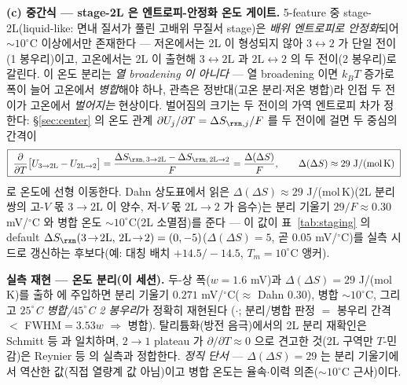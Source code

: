 \textbf{(c) 중간식 --- stage-2L 은 엔트로피-안정화 온도 게이트.}
5-feature 중 stage-2L(liquid-like: 면내 질서가 풀린 고배위 무질서 stage)은 \emph{배위 엔트로피로 안정화}되어
$\sim\!10^\circ$C 이상에서만 존재한다 --- 저온에서는 2L 이 형성되지 않아 $3\!\leftrightarrow\!2$ 가 단일 전이
(1 봉우리)이고, 고온에서는 2L 이 출현해 $3\!\leftrightarrow\!2\mathrm L$ 과 $2\mathrm L\!\leftrightarrow\!2$ 의
두 전이(2 봉우리)로 갈린다. 이 온도 분리는 \emph{열 broadening 이 아니다} --- 열 broadening 이면 $k_BT$
증가로 폭이 늘어 고온에서 \emph{병합}해야 하나, 관측은 정반대(고온 분리$\cdot$저온 병합)라 인접 두 전이가
고온에서 \emph{벌어지는} 현상이다. 벌어짐의 크기는 두 전이의 가역 엔트로피 차가 정한다: \S\ref{sec:center}
의 온도 관계 $\partial U_j/\partial T=\Delta S_{\rxn,j}/F$ 를 두 전이에 걸면 두 중심의 간격이
\begin{equation}
\boxed{\;\frac{\partial}{\partial T}\big[U_{3\to2\mathrm L}-U_{2\mathrm L\to2}\big]
=\frac{\Delta S_{\rxn,\,3\to2\mathrm L}-\Delta S_{\rxn,\,2\mathrm L\to2}}{F}
=\frac{\Delta(\Delta S)}{F},\qquad \Delta(\Delta S)\approx29\ \mathrm{J/(mol\,K)}\;}
\label{eq:gr2l-2Lsplit}
\end{equation}
로 온도에 선형 이동한다. Dahn 상도표에서 읽은 $\Delta(\Delta S)\approx29$ J/(mol\,K)(2L 분리쌍의 고-$V$ 몫
$3\!\to\!2\mathrm L$ 이 양수, 저-$V$ 몫 $2\mathrm L\!\to\!2$ 가 음수)는 분리 기울기 $29/F\approx0.30$ mV/$^\circ$C
와 병합 온도 $\sim\!10^\circ$C(2L 소멸점)를 준다 --- 이 값이 표~\ref{tab:staging} 의 default
$\Delta S_\rxn(3\!\to\!2\mathrm L,\,2\mathrm L\!\to\!2)=(0,-5)$($\Delta(\Delta S)=5$, 곧 $0.05$ mV/$^\circ$C)를
실측 시드로 갱신하는 후보다(예: 대칭 배치 $+14.5/-14.5$, $T_m\!=\!10^\circ$C 앵커).

\begin{verifybox}
\textbf{실측 재현 --- 온도 분리(이 세션).} 두-상 폭($w\!=\!1.6$ mV)과 $\Delta(\Delta S)=29$ J/(mol\,K)를
출하  에 주입하면 분리 기울기 $0.271$ mV/$^\circ$C($\approx$ Dahn $0.30$),
병합 $\sim\!10^\circ$C, 그리고 \emph{$25^\circ$C 병합/$45^\circ$C 2 봉우리}가 정확히 재현된다
($\cdot$; 분리/병합 판정 $=$ 봉우리 간격 $<$ FWHM$=3.53w$
$\Rightarrow$ 병합). 탈리튬화(방전 음극)에서의 2L 분리 재확인은 Schmitt 등\cite{schmitt2022} 과 일치하며,
$2\!\to\!1$ plateau 가 $\partial/\partial T\!\approx\!0$ 으로 견고한 것(2L 구역만 $T$-민감)은
Reynier 등\cite{reynier2003} 의 실측과 정합한다. \emph{정직 단서} --- $\Delta(\Delta S)\!=\!29$ 는 분리
기울기에서 역산한 값(직접 열량계 값 아님)이고 병합 온도는 율속$\cdot$이력 의존($\sim\!10^\circ$C 근사)이다.
\end{verifybox}


